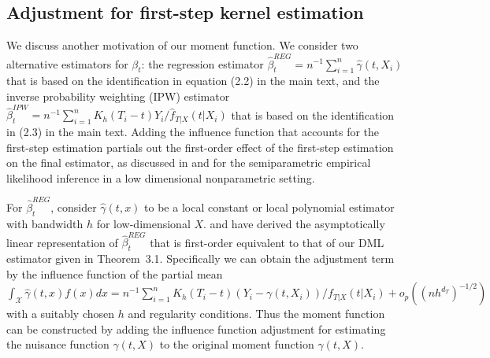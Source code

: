 \documentclass[lettersize, 12pt]{article}
\begin{document}
{\subsection{Adjustment for first-step kernel estimation}
\label{SecKernel}
We discuss another motivation of our moment function.
We consider two alternative estimators for $\beta_t$: the regression estimator 
$\hat \beta^{REG}_t = n^{-1}\sum_{i=1}^n \hat \gamma(t, X_i)$
that is based on the identification in equation (2.2) in the main text,
and the inverse probability weighting (IPW) estimator 
$\hat \beta^{IPW}_t = n^{-1}\sum_{i=1}^n K_h(T_i-t) Y_i/\hat f_{T|X}(t|X_i)$
that is based on the identification in (2.3) in the main text.
Adding the influence function that accounts for the first-step estimation partials out the first-order effect of the first-step estimation on the final estimator, as discussed in \cite{CEINR} and \cite{BEV20AS} for the semiparametric empirical likelihood inference in a low dimensional nonparametric setting.

For $\hat \beta^{REG}_t$, consider $\hat \gamma(t,x)$ to be a local constant or local polynomial estimator with bandwidth $h$ for low-dimensional $X$.
\cite{Newey94ET} and \cite{Lee} have derived the asymptotically linear representation of $\hat \beta^{REG}_t$ that is first-order equivalent to that of our DML estimator given in Theorem~3.1.
Specifically we can obtain the adjustment term by the influence function of the partial mean 
$\int_{\mathcal{X}} \hat \gamma(t,x) f(x) dx = n^{-1}\sum_{i=1}^n K_h(T_i - t)(Y_i - \gamma(t, X_i))/f_{T|X}(t|X_i) + o_p((nh^{d_T})^{-1/2})$ with a suitably chosen $h$ and regularity conditions.
Thus the moment function can be constructed by adding the influence function adjustment for estimating 
the nuisance function $\gamma(t, X)$ to the original moment function $\gamma(t, X)$.

}
\end{document}
